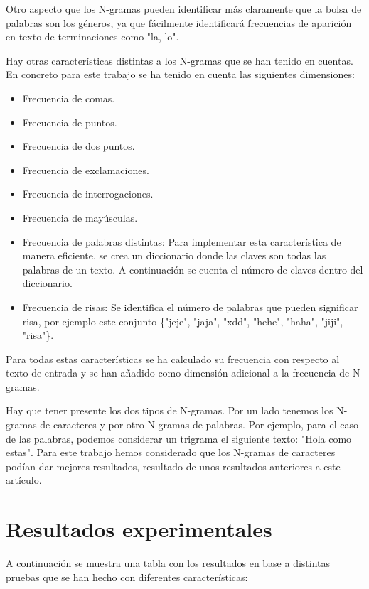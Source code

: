 \documentclass[11pt,a4paper]{article}
\begin{document}
Otro aspecto que los N-gramas pueden identificar más claramente que la bolsa de palabras son los géneros, ya que fácilmente identificará frecuencias de aparición en texto de terminaciones como "la, lo".

Hay otras características distintas a los N-gramas que se han tenido en cuentas. En concreto para este trabajo se ha tenido en cuenta las siguientes dimensiones:
\begin{itemize}
\item Frecuencia de comas.
\item Frecuencia de puntos.
\item Frecuencia de dos puntos.
\item Frecuencia de exclamaciones.
\item Frecuencia de interrogaciones.
\item Frecuencia de mayúsculas.
\item Frecuencia de palabras distintas: Para implementar esta característica de manera eficiente, se crea un diccionario donde las claves son todas las palabras de un texto. A continuación se cuenta el número de claves dentro del diccionario.
\item Frecuencia de risas: Se identifica el número de palabras que pueden significar risa, por ejemplo este conjunto \{"jeje", "jaja", "xdd", "hehe", "haha", "jiji", "risa"\}.
\end{itemize}

Para todas estas características se ha calculado su frecuencia con respecto al texto de entrada y se han añadido como dimensión adicional a la frecuencia de N-gramas.

Hay que tener presente los dos tipos de N-gramas. Por un lado tenemos los N-gramas de caracteres y por otro N-gramas de palabras. Por ejemplo, para el caso de las palabras, podemos considerar un trigrama el siguiente texto: "Hola como estas". Para este trabajo hemos considerado que los N-gramas de caracteres podían dar mejores resultados, resultado de unos resultados anteriores a este artículo.

\section{Resultados experimentales}

A continuación se muestra una tabla con los resultados en base a distintas pruebas que se han hecho con diferentes características:
\end{document}
